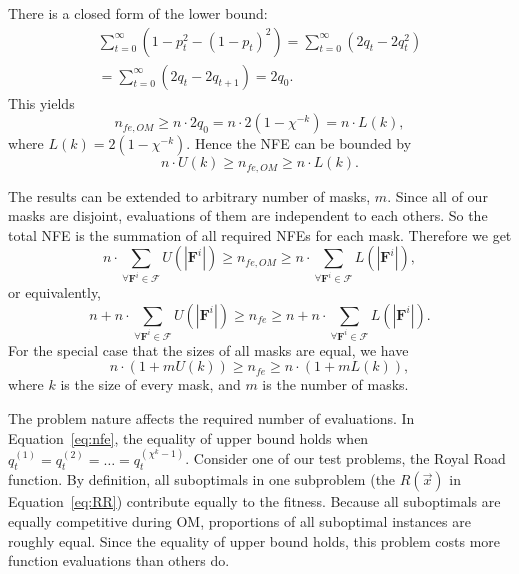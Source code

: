 \documentclass{sig-alternate}
\begin{document}
There is a closed form of the lower bound:
\begin{equation*}
\begin{aligned}
\sum\limits_{t=0}^{\infty}\left(1-p_t^2-\left(1-p_t\right)^2\right)
=\sum\limits_{t=0}^{\infty} \left(2 q_t - 2 q_t^2\right) \\
=\sum\limits_{t=0}^{\infty} \left(2q_t - 2q_{t+1}\right)
=2q_0.
\end{aligned}
\end{equation*}
This yields
\begin{equation*}
n_{fe,OM} \geq n\cdot 2q_0 = n\cdot2\left(1-\chi^{-k}\right) = n\cdot L\left(k\right),
\end{equation*}
where $L\left(k\right) = 2\left(1-\chi^{-k}\right)$.
Hence the NFE can be bounded by
\begin{equation*}
n\cdot U\left(k\right) \geq n_{fe,OM} \geq n\cdot L\left(k\right).
\end{equation*}

The results can be extended to arbitrary number of masks, $m$.
Since all of our masks are disjoint, evaluations of them are independent to each others.
So the total NFE is the summation of all required NFEs for each mask.
Therefore we get
\begin{equation*}
n\cdot \sum_{\forall {\mathbf{F}}^i \in {\mathcal{F}}} U\left(|{\mathbf{F}}^i|\right)
\geq
n_{fe,OM}
\geq
n\cdot \sum_{\forall {\mathbf{F}}^i \in {\mathcal{F}}} L\left(|{\mathbf{F}}^i|\right),
\end{equation*}
or equivalently,
\begin{equation}
n+n\cdot \sum_{\forall {\mathbf{F}}^i \in {\mathcal{F}}} U\left(|{\mathbf{F}}^i|\right) 
\geq
n_{fe}
\geq
n+n\cdot \sum_{\forall {\mathbf{F}}^i \in {\mathcal{F}}} L\left(|{\mathbf{F}}^i|\right).
\end{equation}
For the special case that the sizes of all masks are equal, we have
\begin{equation}
\label{eq:nfe}
n\cdot\left(1+mU\left(k\right)\right)
\geq
n_{fe}
\geq
n\cdot\left(1+mL\left(k\right)\right),
\end{equation}
where $k$ is the size of every mask,
and $m$ is the number of masks.

The problem nature affects the required number of evaluations.
In Equation~\ref{eq:nfe}, the equality of upper bound holds when $q_t^{\left(1\right)} = q_t^{\left(2\right)} = \dots = q_t^{\left(\chi^k-1\right)}$.
Consider one of our test problems, the Royal Road function. %
By definition, all suboptimals in one subproblem (the $R\left(\vec x\right)$ in Equation~\ref{eq:RR}) contribute equally to the fitness.
Because all suboptimals are equally competitive during OM,
proportions of all suboptimal instances are roughly equal.
Since the equality of upper bound holds,
this problem costs more function evaluations than others do.
\end{document}
